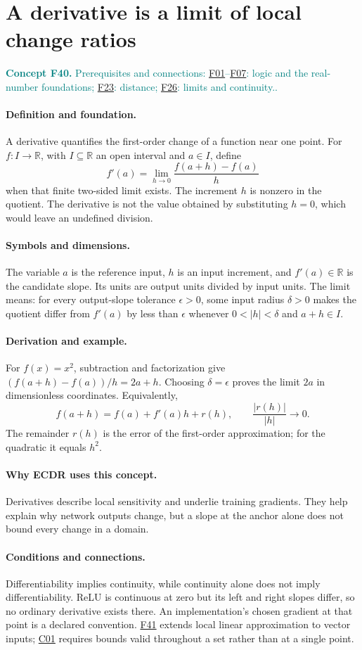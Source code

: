 \documentclass[11pt,a4paper]{article}
\newcommand{\R}{\mathbb R}
\newcommand{\abs}[1]{\left\lvert#1\right\rvert}
\newcommand{\conceptid}{Front matter}
\newcommand{\concept}[3]{\clearpage\renewcommand{\conceptid}{#1}%
\section{#2}\label{concept:#1}%
\textcolor{teal}{\textbf{Concept #1.} Prerequisites and connections: #3.}\par
\typeout{ECDR-CONCEPT-START #1 PAGE=\thepage}}
\begin{document}
\concept{F40}{A derivative is a limit of local change ratios}{\hyperref[concept:F01]{F01}--\hyperref[concept:F07]{F07}: logic and the real-number foundations; \hyperref[concept:F23]{F23}: distance; \hyperref[concept:F26]{F26}: limits and continuity.}
\paragraph{Definition and foundation.}
A derivative quantifies the first-order change of a function near one point. For $f:I\to\R$, with $I\subseteq\R$ an open interval and $a\in I$, define
\[
 f'(a)=\lim_{h\to0}\frac{f(a+h)-f(a)}h
\]
when that finite two-sided limit exists. The increment $h$ is nonzero in the quotient. The derivative is not the value obtained by substituting $h=0$, which would leave an undefined division.
\paragraph{Symbols and dimensions.}
The variable $a$ is the reference input, $h$ is an input increment, and $f'(a)\in\R$ is the candidate slope. Its units are output units divided by input units. The limit means: for every output-slope tolerance $\epsilon>0$, some input radius $\delta>0$ makes the quotient differ from $f'(a)$ by less than $\epsilon$ whenever $0<\abs h<\delta$ and $a+h\in I$.
\paragraph{Derivation and example.}
For $f(x)=x^2$, subtraction and factorization give $(f(a+h)-f(a))/h=2a+h$. Choosing $\delta=\epsilon$ proves the limit $2a$ in dimensionless coordinates. Equivalently,
\[
 f(a+h)=f(a)+f'(a)h+r(h),\qquad
 \frac{\abs{r(h)}}{\abs h}\longrightarrow0.
\]
The remainder $r(h)$ is the error of the first-order approximation; for the quadratic it equals $h^2$.
\paragraph{Why ECDR uses this concept.}
Derivatives describe local sensitivity and underlie training gradients. They help explain why network outputs change, but a slope at the anchor alone does not bound every change in a domain.
\paragraph{Conditions and connections.}
Differentiability implies continuity, while continuity alone does not imply differentiability. ReLU is continuous at zero but its left and right slopes differ, so no ordinary derivative exists there. An implementation's chosen gradient at that point is a declared convention. \hyperref[concept:F41]{F41} extends local linear approximation to vector inputs; \hyperref[concept:C01]{C01} requires bounds valid throughout a set rather than at a single point.
\par\label{endconcept:F40}
\end{document}
